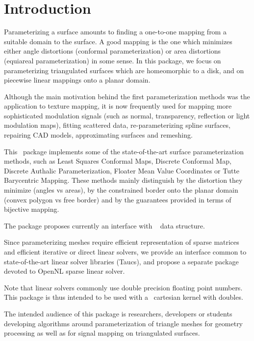 \section{Introduction}

Parameterizing a surface amounts to finding a one-to-one mapping from
a suitable domain to the surface. A good mapping is the one which
minimizes either angle distortions (conformal parameterization) or
area distortions (equiareal parameterization) in some sense.  In this
package, we focus on parameterizing triangulated surfaces which are
homeomorphic to a disk, and on piecewise linear mappings onto a planar
domain.

Although the main motivation behind the first parameterization methods
was the application to texture mapping, it is now frequently used for
mapping more sophisticated modulation signals (such as normal,
transparency, reflection or light modulation maps), fitting scattered
data, re-parameterizing spline surfaces, repairing CAD models,
approximating surfaces and remeshing.

This \cgal\ package implements some of the state-of-the-art
surface parameterization methods, such as Least Squares Conformal Maps,
Discrete Conformal Map, Discrete Authalic
Parameterization, Floater Mean Value Coordinates or Tutte Barycentric
Mapping. These methods mainly distinguish by the distortion they
minimize (angles vs areas), by the constrained border onto the
planar domain (convex polygon vs free border) and by the guarantees
provided in terms of bijective mapping.

The package proposes currently an interface with \cgal\ 
data structure.

Since parameterizing meshes require efficient representation of sparse
matrices and efficient iterative or direct linear solvers, we provide
an interface common to state-of-the-art linear solver libraries ({\sc Taucs}),
and propose a separate package devoted to OpenNL sparse
linear solver.

Note that linear solvers commonly use double precision floating point
numbers. This package is thus intended to be used with a \cgal\
cartesian kernel with doubles.

The intended audience of this package is researchers, developers or
students developing algorithms around parameterization of triangle
meshes for geometry processing as well as for signal mapping on
triangulated surfaces.

